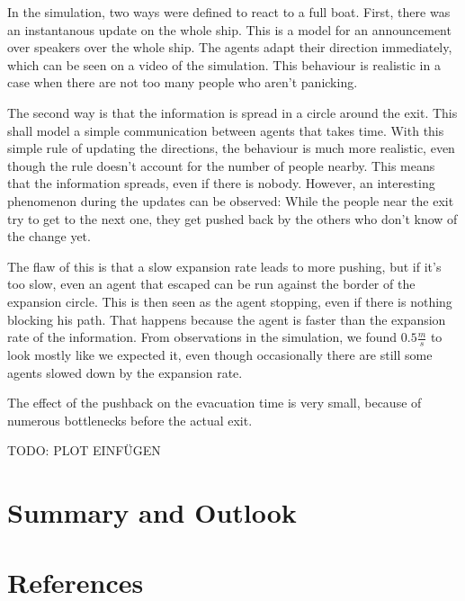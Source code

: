 \documentclass[11pt]{article}
\begin{document}
In the simulation, two ways were defined to react to a full boat.  First, there
was an instantanous update on the whole ship.  This is a model for an
announcement over speakers over the whole ship.  The agents adapt their
direction immediately, which can be seen on a video of the simulation.  This
behaviour is realistic in a case when there are not too many people who aren't
panicking.

The second way is that the information is spread in a circle around the exit.
This shall model a simple communication between agents that takes time.  With
this simple rule of updating the directions, the behaviour is much more
realistic, even though the rule doesn't account for the number of people
nearby.  This means that the information spreads, even if there is nobody.
However, an interesting phenomenon during the updates can be observed:  While
the people near the exit try to get to the next one, they get pushed back by
the others who don't know of the change yet.

The flaw of this is that a slow expansion rate leads to more pushing, but if
it's too slow, even an agent that escaped can be run against the border of the
expansion circle.  This is then seen as the agent stopping, even if there is
nothing blocking his path. That happens because the agent is faster than the
expansion rate of the information. From observations in the simulation, we
found \(0.5\frac{m}{s}\) to look mostly like we expected it, even though
occasionally there are still some agents slowed down by the expansion rate.

The effect of the pushback on the evacuation time is very small, because of
numerous bottlenecks before the actual exit.

TODO: PLOT EINFÜGEN


\section{Summary and Outlook}

\section{References}

\end{document}
